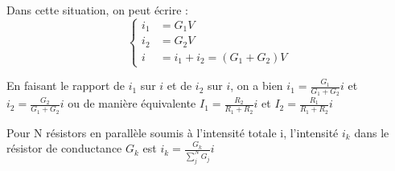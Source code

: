 \documentclass[french]{yLectureNote}
\begin{document}
Dans cette situation, on peut écrire :
\[ \left\{\begin{matrix}
 i_1 &= G_1V\\
 i_2 &= G_2V\\
 i &= i_1+i_2 = (G_1+G_2)V
\end{matrix}\right.\]

En faisant le rapport de $i_1$ sur $i$ et de $i_2$ sur $i$, on a bien \(\displaystyle i_1 = \frac{G_1}{G_1+G_2}i\) et \(\displaystyle i_2 = \frac{G_2}{G_1+G_2}i\) ou de manière équivalente $\displaystyle I_1 = \frac{R_2}{R_1+R_2}i$ et $\displaystyle I_2 = \frac{R_1}{R_1+R_2}i$

\begin{theorem}
Pour N résistors en
parallèle soumis à l’intensité totale i, l’intensité $i_k$ dans le résistor de conductance $G_k$
est \(i_k = \frac{G_k}{\sum_j^N G_j}i\)
\end{theorem}
\end{document}
